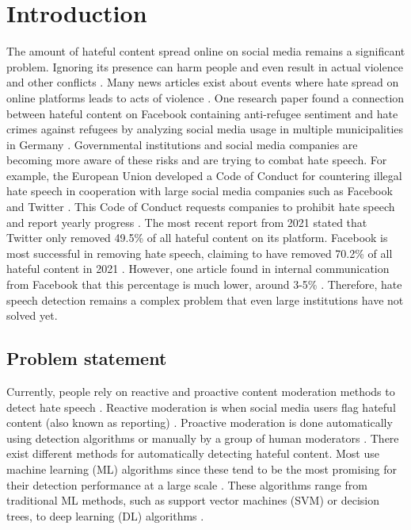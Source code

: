 \chapter{Introduction}
\label{ch:introduction}
\newcommand{\customtextbox}[1]{
	\setlength{\fboxsep}{0.5em}
	\fbox{
		\begin{minipage}{\linewidth-1.7em}
			\vspace*{0.25em}
			#1
		\end{minipage}
	}
}

The amount of hateful content spread online on social media remains a significant problem.
%
Ignoring its presence can harm people and even result in actual violence and other conflicts \citep{ecri-hate-speech-and-violence, balayn2021automatic}.
%
Many news articles exist about events where hate spread on online platforms leads to acts of violence \citep{columbia-facebook-linked-to-violence, mujib-mashal-india, paul-mozur-2018, muller2021fanning}.
%
One research paper found a connection between hateful content on Facebook containing anti-refugee sentiment and hate crimes against refugees by analyzing social media usage in multiple municipalities in Germany \citep{muller2021fanning}.
%
Governmental institutions and social media companies are becoming more aware of these risks and are trying to combat hate speech.
%
For example, the European Union developed a Code of Conduct for countering illegal hate speech in cooperation with large social media companies such as Facebook and Twitter \citep{eu-code-of-conduct}.
%
This Code of Conduct requests companies to prohibit hate speech and report yearly progress \citep{eu-code-of-conduct}.
%
The most recent report from 2021 stated that Twitter only removed 49.5\% of all hateful content on its platform.
%
Facebook is most successful in removing hate speech, claiming to have removed 70.2\% of all hateful content in 2021 \citep{eu-code-of-conduct}.
%
However, one article found in internal communication from Facebook that this percentage is much lower, around 3-5\% \citep{noah2021giansiracusa}.
%
Therefore, hate speech detection remains a complex problem that even large institutions have not solved yet.

\section{Problem statement}
Currently, people rely on reactive and proactive content moderation methods to detect hate speech \citep{klonick2017new}.
%
Reactive moderation is when social media users flag hateful content (also known as reporting) \citep{klonick2017new}.
%
Proactive moderation is done automatically using detection algorithms or manually by a group of human moderators \citep{klonick2017new}.
%
There exist different methods for automatically detecting hateful content.
%
Most use machine learning (ML) algorithms since these tend to be the most promising for their detection performance at a large scale \citep{balayn2021automatic, fortuna2018survey}.
%
These algorithms range from traditional ML methods, such as support vector machines (SVM) or decision trees, to deep learning (DL) algorithms \citep{fortuna2018survey}.
%

